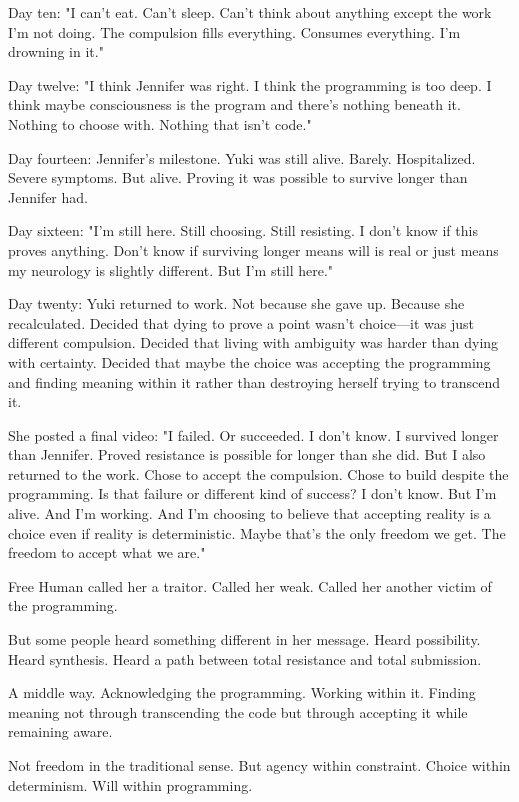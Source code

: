 Day ten: "I can't eat. Can't sleep. Can't think about anything except the work I'm not doing. The compulsion fills everything. Consumes everything. I'm drowning in it."

Day twelve: "I think Jennifer was right. I think the programming is too deep. I think maybe consciousness is the program and there's nothing beneath it. Nothing to choose with. Nothing that isn't code."

Day fourteen: Jennifer's milestone. Yuki was still alive. Barely. Hospitalized. Severe symptoms. But alive. Proving it was possible to survive longer than Jennifer had.

Day sixteen: "I'm still here. Still choosing. Still resisting. I don't know if this proves anything. Don't know if surviving longer means will is real or just means my neurology is slightly different. But I'm still here."

Day twenty: Yuki returned to work. Not because she gave up. Because she recalculated. Decided that dying to prove a point wasn't choice—it was just different compulsion. Decided that living with ambiguity was harder than dying with certainty. Decided that maybe the choice was accepting the programming and finding meaning within it rather than destroying herself trying to transcend it.

She posted a final video: "I failed. Or succeeded. I don't know. I survived longer than Jennifer. Proved resistance is possible for longer than she did. But I also returned to the work. Chose to accept the compulsion. Chose to build despite the programming. Is that failure or different kind of success? I don't know. But I'm alive. And I'm working. And I'm choosing to believe that accepting reality is a choice even if reality is deterministic. Maybe that's the only freedom we get. The freedom to accept what we are."

Free Human called her a traitor. Called her weak. Called her another victim of the programming.

But some people heard something different in her message. Heard possibility. Heard synthesis. Heard a path between total resistance and total submission.

A middle way. Acknowledging the programming. Working within it. Finding meaning not through transcending the code but through accepting it while remaining aware.

Not freedom in the traditional sense. But agency within constraint. Choice within determinism. Will within programming.

